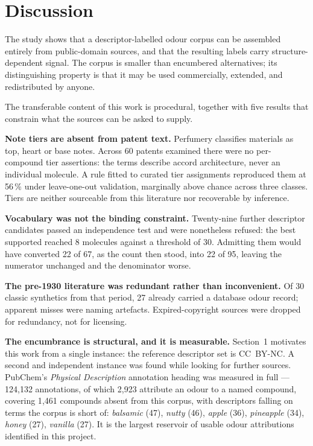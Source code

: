 \documentclass[
  computerscience
]{genesisl1-paper}
\begin{document}
\section{Discussion}

The study shows that a descriptor-labelled odour corpus can be assembled entirely from
public-domain sources, and that the resulting labels carry structure-dependent signal.
The corpus is smaller than encumbered alternatives; its distinguishing property is that
it may be used commercially, extended, and redistributed by anyone.

The transferable content of this work is procedural, together with five results that
constrain what the sources can be asked to supply.

\textbf{Note tiers are absent from patent text.} Perfumery classifies materials as top,
heart or base notes. Across 60 patents examined there were no per-compound tier
assertions: the terms describe accord architecture, never an individual molecule. A rule
fitted to curated tier assignments reproduced them at 56\,\% under leave-one-out
validation, marginally above chance across three classes. Tiers are neither sourceable
from this literature nor recoverable by inference.

\textbf{Vocabulary was not the binding constraint.} Twenty-nine further descriptor
candidates passed an independence test and were nonetheless refused: the best supported
reached 8 molecules against a threshold of 30. Admitting them would have converted 22 of
67, as the count then stood, into 22 of 95, leaving the numerator unchanged and the
denominator worse.

\textbf{The pre-1930 literature was redundant rather than inconvenient.} Of 30 classic
synthetics from that period, 27 already carried a database odour record; apparent misses
were naming artefacts. Expired-copyright sources were dropped for redundancy, not for
licensing.

\textbf{The encumbrance is structural, and it is measurable.} Section~1 motivates this
work from a single instance: the reference descriptor set is CC~BY-NC. A second and
independent instance was found while looking for further sources. PubChem's
\emph{Physical Description} annotation heading was measured in full --- 124{,}132
annotations, of which 2{,}923 attribute an odour to a named compound, covering 1{,}461
compounds absent from this corpus, with descriptors falling on terms the corpus is short
of: \emph{balsamic} (47), \emph{nutty} (46), \emph{apple} (36), \emph{pineapple} (34),
\emph{honey} (27), \emph{vanilla} (27). It is the largest reservoir of usable odour
attributions identified in this project.
\end{document}
